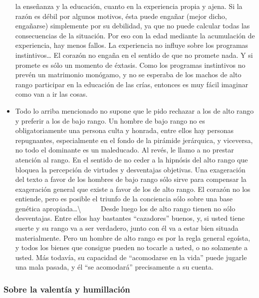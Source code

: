 \begin{itemize}
  la enseñanza y la educación, cuanto en la experiencia propia y ajena.
  Si la razón es débil por algunos motivos, ésta puede engañar (mejor
  dicho, engañarse) simplemente por su debilidad, ya que no puede
  calcular todas las consecuencias de la situación. Por eso con la edad
  mediante la acumulación de experiencia, hay menos fallos. La
  experiencia no influye sobre los programas instintivos\ldots{} El
  corazón no engaña en el sentido de que no promete nada. Y si promete
  es sólo un momento de éxtasis. Como los programas instintivos no
  prevén un matrimonio monógamo, y no se esperaba de los machos de alto
  rango participar en la educación de las crías, entonces es muy fácil
  imaginar como van a ir las cosas.
\item
  Todo lo arriba mencionado no supone que le pido rechazar a los de alto
  rango y preferir a los de bajo rango. Un hombre de bajo rango no es
  obligatoriamente una persona culta y honrada, entre ellos hay personas
  repugnantes, especialmente en el fondo de la pirámide jerárquica, y
  viceversa, no todo el dominante es un maleducado. Al revés, le llamo a
  no prestar atención al rango. En el sentido de no ceder a la hipnósis
  del alto rango que bloquea la percepción de virtudes y desventajas
  objetivas. Una exageración del texto a favor de los hombres de bajo
  rango sólo sirve para compensar la exageración general que existe a
  favor de los de alto rango. El corazón no los entiende, pero es
  posible el triunfo de la conciencia sólo sobre una base genética
  apropiada\ldots{}\textbackslash{} ~ ~ ~ Desde luego los de alto rango
  tienen no sólo desventajas. Entre ellos hay bastantes ``cazadores''
  buenos, y, si usted tiene suerte y su rango va a ser verdadero, junto
  con él va a estar bien situada materialmente. Pero un hombre de alto
  rango es por la regla general egoísta, y todos los bienes que consigue
  pueden no tocarle a usted, o no solamente a usted. Más todavía, su
  capacidad de ``acomodarse en la vida'' puede jugarle una mala pasada,
  y él ``se acomodará'' precisamente a su cuenta.
\end{itemize}

\protect\hypertarget{M19}{}{}

\subsubsection{Sobre la valentía y
humillación}\label{sobre-la-valentuxeda-y-humillaciuxf3n}

